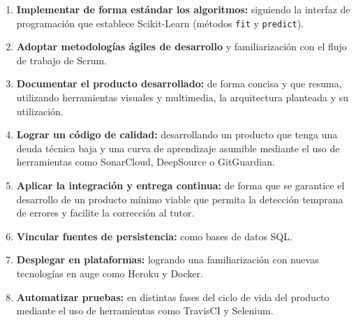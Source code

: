 \begin{enumerate}
	\item \textbf{Implementar de forma estándar los algoritmos:} siguiendo la interfaz de programación que establece Scikit-Learn (métodos \texttt{fit} y \texttt{predict}).
	\item \textbf{Adoptar metodologías ágiles de desarrollo} y familiarización con el flujo de trabajo de Scrum.
	\item \textbf{Documentar el producto desarrollado:} de forma concisa y que resuma, utilizando herramientas visuales y multimedia, la arquitectura planteada y su utilización.
	\item \textbf{Lograr un código de calidad:} desarrollando un producto que tenga una deuda técnica baja y una curva de aprendizaje asumible mediante el uso de herramientas como SonarCloud, DeepSource o GitGuardian.
	\item \textbf{Aplicar la integración y entrega continua:} de forma que se garantice el desarrollo de un producto mínimo viable que permita la detección temprana de errores y facilite la corrección al tutor.
	\item \textbf{Vincular fuentes de persistencia:} como bases de datos SQL.
	\item \textbf{Desplegar en plataformas:} logrando una familiarización con nuevas tecnologías en auge como Heroku y Docker.
	\item \textbf{Automatizar pruebas:} en distintas fases del ciclo de vida del producto mediante el uso de herramientas como TravisCI y Selenium.
	
\end{enumerate}
